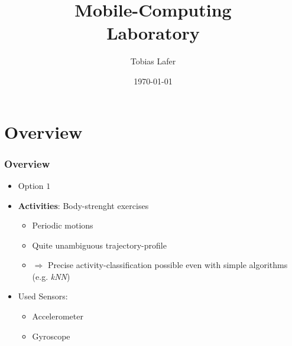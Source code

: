 \documentclass[aspectratio=169]{beamer}
\title[Mid-term presentation]{Mobile-Computing\\ Laboratory}
\author{Tobias Lafer}
\date{\today}
\institute[]{}
\begin{document}
\titleframe

\begin{frame}
  \frametitle{}
  \tableofcontents%
\end{frame}

\section{Overview}
\begin{frame}
	\frametitle{Overview}
	\begin{itemize}
		\item Option $1$
		\item \textbf{Activities}: Body-strenght exercises
		\begin{itemize}
			\item Periodic motions
			\item Quite unambiguous trajectory-profile
			\item $\Rightarrow$ Precise activity-classification possible even with simple algorithms (e.g. \textit{kNN})
		\end{itemize}
		\item Used Sensors:
		\begin{itemize}
			\item Accelerometer
			\item Gyroscope
		\end{itemize}
	\end{itemize}
\end{frame}
\end{document}
